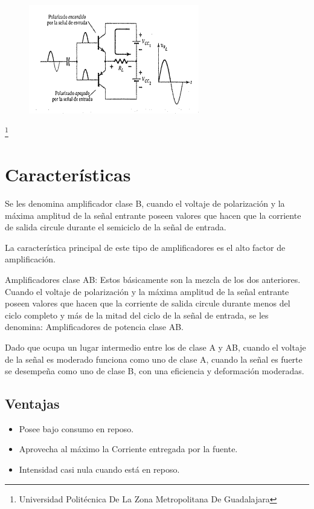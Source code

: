 \documentclass[11pt,a4paper]{article}
\begin{document}
\begin{figure}[hbtp]
\centering
\includegraphics[scale=0.90]{ejemplo3.png}
\end{figure}   

\footnote{Universidad Politécnica De La Zona Metropolitana De Guadalajara} 
\newpage

\section{Características}

Se les denomina amplificador clase B, cuando el voltaje de polarización y la máxima amplitud de la señal entrante poseen valores que hacen que la corriente de salida circule durante el semiciclo de la señal de entrada.

La característica principal de este tipo de amplificadores es el alto factor de amplificación.

Amplificadores clase AB: Estos básicamente son la mezcla de los dos anteriores. Cuando el voltaje de polarización y la máxima amplitud de la señal entrante poseen valores que hacen que la corriente de salida circule durante menos del ciclo completo y más de la mitad del ciclo de la señal de entrada, se les denomina: Amplificadores de potencia clase AB.

Dado que ocupa un lugar intermedio entre los de clase A y AB, cuando el voltaje de la señal es moderado funciona como uno de clase A, cuando la señal es fuerte se desempeña como uno de clase B, con una eficiencia y deformación moderadas. 

\subsection{Ventajas}

\begin{itemize}


\item Posee bajo consumo en reposo.    
\item Aprovecha al máximo la Corriente entregada por la fuente.
\item Intensidad casi nula cuando está en reposo.

\end{itemize}
\end{document}
